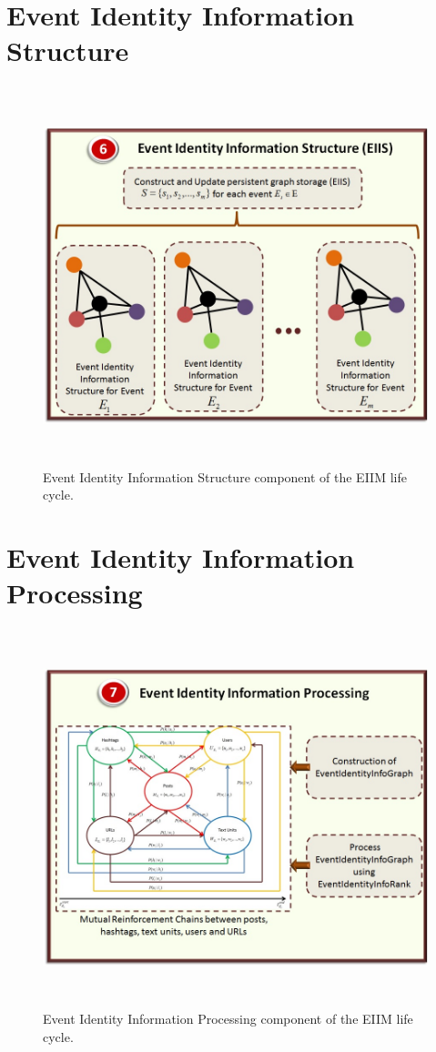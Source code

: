 \section{Event Identity Information Structure}

\begin{figure}[htbp]
  \caption{Event Identity Information Structure component of the EIIM life cycle.}
  \centering
    \includegraphics[width=14cm,height=11cm]{Figures/EIIMComponents/EventIdentityInformationStructure.jpg}
\end{figure}

\section{Event Identity Information Processing\label{EventIdentityInformationProcessing}}

\begin{figure}[htbp]
  \caption{Event Identity Information Processing component of the EIIM life cycle.}
  \centering
    \includegraphics[width=14cm,height=11cm]{Figures/EIIMComponents/EventIdentityInformationProcessing.jpg}
\end{figure}


